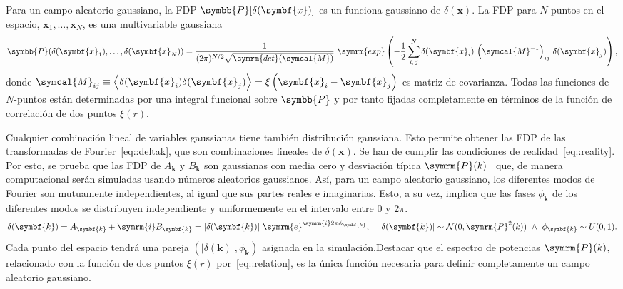 Para un campo aleatorio gaussiano, la FDP \(\symbb{P}[\delta(\symbf{x})]\) es un funciona gaussiano de \(\delta(\symbf{x})\). La FDP para \(N\) puntos en el espacio, \(\symbf{x}_1,\ldots,\symbf{x}_N\), es una multivariable gaussiana
\begin{equation}
    \symbb{P}(\delta(\symbf{x}_1),\ldots,\delta(\symbf{x}_N))=\frac{1}{(2\pi)^{N/2}\sqrt{\symrm{det}(\symcal{M})}}\ \symrm{exp}\left(-\frac{1}{2}\sum^N_{i,\,j}\delta(\symbf{x}_i)\,\left(\symcal{M}^{-1}\right)_{ij}\,\delta(\symbf{x}_j)\right),
\end{equation}
donde \(\symcal{M}_{ij}\equiv\left\langle\delta(\symbf{x}_i)\delta(\symbf{x}_j)\right\rangle=\xi\left(\symbf{x}_i-\symbf{x}_j\right)\) es matriz de covarianza. Todas las funciones de \(N\)-puntos están determinadas por una integral funcional sobre \(\symbb{P}\) y por tanto fijadas completamente en términos de la función de correlación de dos puntos \(\xi(r)\).

Cualquier combinación lineal de variables gaussianas tiene también distribución gaussiana. Esto permite obtener las FDP de las transformadas de Fourier~\ref{eq::deltak}, que son combinaciones lineales de \(\delta(\symbf{x})\). Se han de cumplir las condiciones de realidad~\ref{eq::reality}. Por esto, se prueba que las FDP de \(A_{\symbf{k}}\) y \(B_{\symbf{k}}\) son gaussianas con media cero y desviación típica \(\symrm{P}(k)\)~\cite{mo_van} que, de manera computacional serán simuladas usando números aleatorios gaussianos. Así, para un campo aleatorio gaussiano, los diferentes modos de Fourier son mutuamente independientes, al igual que sus partes reales e imaginarias. Esto, a su vez, implica que las fases \(\phi_{\symbf{k}}\) de los diferentes modos se distribuyen independiente y uniformemente en el intervalo entre 0 y \(2\pi\). 
\begin{equation}
    \delta(\symbf{k})=A_{\symbf{k}}+\symrm{i}B_{\symbf{k}}=\left|\delta(\symbf{k})\right|\,\symrm{e}^{\symrm{i}2\pi\phi_{\symbf{k}}},\quad \left|\delta(\symbf{k})\right|\sim\mathcal{N}(0,\symrm{P}^2(k))\ \wedge\ \phi_{\symbf{k}}\sim U(0,1).
\end{equation}
Cada punto del espacio tendrá una pareja \(\left(\left|\delta(\symbf{k})\right|,\phi_{\symbf{k}}\right)\) asignada en la simulación.Destacar que el espectro de potencias \(\symrm{P}(k)\), relacionado con la función de dos puntos \(\xi(r)\) por~\ref{eq::relation}, es la única función necesaria para definir completamente un campo aleatorio gaussiano.

